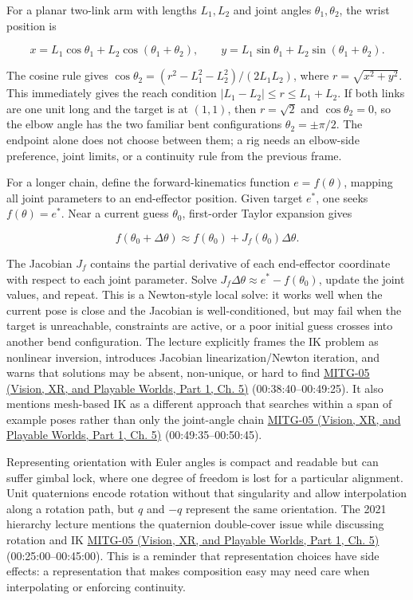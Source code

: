 For a planar two-link arm with lengths \(L_1,L_2\) and joint angles \(\theta_1,\theta_2\), the wrist position is

\[
x=L_1\cos\theta_1+L_2\cos(\theta_1+\theta_2),\qquad
y=L_1\sin\theta_1+L_2\sin(\theta_1+\theta_2).
\]

The cosine rule gives \(\cos\theta_2=(r^2-L_1^2-L_2^2)/(2L_1L_2)\), where \(r=\sqrt{x^2+y^2}\). This immediately gives the reach condition \(|L_1-L_2|\le r\le L_1+L_2\). If both links are one unit long and the target is at \((1,1)\), then \(r=\sqrt2\) and \(\cos\theta_2=0\), so the elbow angle has the two familiar bent configurations \(\theta_2=\pm\pi/2\). The endpoint alone does not choose between them; a rig needs an elbow-side preference, joint limits, or a continuity rule from the previous frame.

For a longer chain, define the forward-kinematics function \(e=f(\theta)\), mapping all joint parameters to an end-effector position. Given target \(e^*\), one seeks \(f(\theta)=e^*\). Near a current guess \(\theta_0\), first-order Taylor expansion gives

\[
f(\theta_0+\Delta\theta)\approx f(\theta_0)+J_f(\theta_0)\Delta\theta.
\]

The Jacobian \(J_f\) contains the partial derivative of each end-effector coordinate with respect to each joint parameter. Solve \(J_f\Delta\theta\approx e^*-f(\theta_0)\), update the joint values, and repeat. This is a Newton-style local solve: it works well when the current pose is close and the Jacobian is well-conditioned, but may fail when the target is unreachable, constraints are active, or a poor initial guess crosses into another bend configuration. The lecture explicitly frames the IK problem as nonlinear inversion, introduces Jacobian linearization/Newton iteration, and warns that solutions may be absent, non-unique, or hard to find \href{../07-Vision-XR-and-Playable-Worlds-P01/main.pdf\#nameddest=04-visual-computing-ii-ch036-mitg-05---hierarchical-modeling}{MITG-05 (Vision, XR, and Playable Worlds, Part 1, Ch. 5)} (00:38:40--00:49:25). It also mentions mesh-based IK as a different approach that searches within a span of example poses rather than only the joint-angle chain \href{../07-Vision-XR-and-Playable-Worlds-P01/main.pdf\#nameddest=04-visual-computing-ii-ch036-mitg-05---hierarchical-modeling}{MITG-05 (Vision, XR, and Playable Worlds, Part 1, Ch. 5)} (00:49:35--00:50:45).

Representing orientation with Euler angles is compact and readable but can suffer gimbal lock, where one degree of freedom is lost for a particular alignment. Unit quaternions encode rotation without that singularity and allow interpolation along a rotation path, but \(q\) and \(-q\) represent the same orientation. The 2021 hierarchy lecture mentions the quaternion double-cover issue while discussing rotation and IK \href{../07-Vision-XR-and-Playable-Worlds-P01/main.pdf\#nameddest=04-visual-computing-ii-ch036-mitg-05---hierarchical-modeling}{MITG-05 (Vision, XR, and Playable Worlds, Part 1, Ch. 5)} (00:25:00--00:45:00). This is a reminder that representation choices have side effects: a representation that makes composition easy may need care when interpolating or enforcing continuity.

